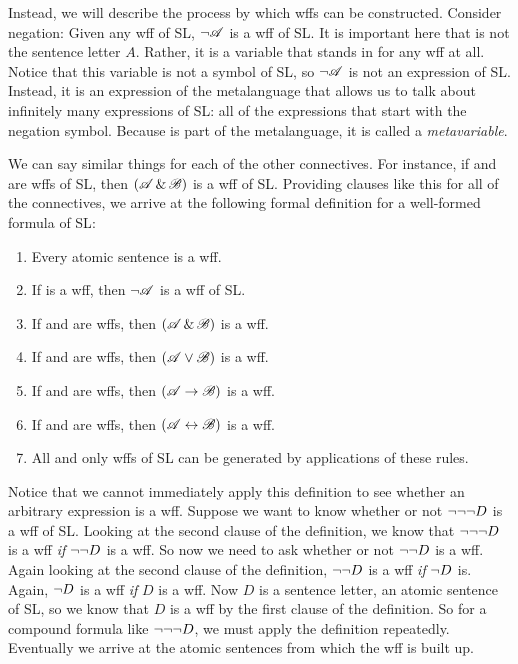 Instead, we will describe the process by which wffs can be constructed. Consider negation: Given any wff  of SL, $\neg\mathscr{A}$ is a wff of SL. It is important here that  is not the sentence letter $A$. Rather, it is a variable that stands in for any wff at all. Notice that this variable  is not a symbol of SL, so $\neg\mathscr{A}$ is not an expression of SL. Instead, it is an expression of the metalanguage that allows us to talk about infinitely many expressions of SL: all of the expressions that start with the negation symbol. Because  is part of the metalanguage, it is called a \emph{metavariable}.

We can say similar things for each of the other connectives. For instance, if  and  are wffs of SL, then $(\mathscr{A}\,\&\,\mathscr{B})$ is a wff of SL. Providing clauses like this for all of the connectives, we arrive at the following formal definition for a {well-formed formula of SL}:

\begin{enumerate}
\item Every atomic sentence is a wff.
\item If  is a wff, then $\neg\mathscr{A}$ is a wff of SL.
\item If  and  are wffs, then $(\mathscr{A}\,\&\,\mathscr{B})$ is a wff.
\item If  and  are wffs, then $(\mathscr{A}\vee\mathscr{B})$ is a wff.
\item If  and  are wffs, then $(\mathscr{A}\rightarrow\mathscr{B})$ is a wff.
\item If  and  are wffs, then $(\mathscr{A}\leftrightarrow\mathscr{B})$ is a wff.
\item All and only wffs of SL can be generated by applications of these rules.
\end{enumerate}


Notice that we cannot immediately apply this definition to see whether an arbitrary expression is a wff. Suppose we want to know whether or not $\neg \neg \neg D$ is a wff of SL. Looking at the second clause of the definition, we know that $\neg \neg \neg D$ is a wff \emph{if} $\neg \neg D$ is a wff. So now we need to ask whether or not $\neg \neg D$ is a wff. Again looking at the second clause of the definition, $\neg \neg D$ is a wff \emph{if} $\neg D$ is. Again, $\neg D$ is a wff \emph{if} $D$ is a wff. Now $D$ is a sentence letter, an atomic sentence of SL, so we know that $D$ is a wff by the first clause of the definition. So for a compound formula like $\neg \neg \neg D$, we must apply the definition repeatedly. Eventually we arrive at the atomic sentences from which the wff is built up.

